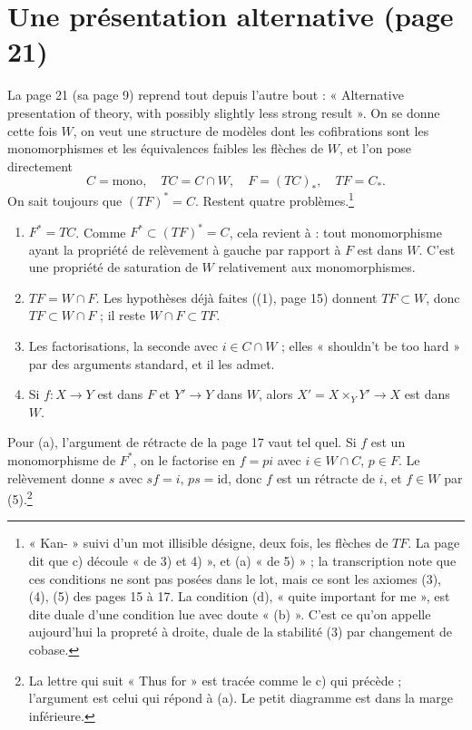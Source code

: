 \documentclass[11pt,a4paper]{article}
\begin{document}
\section*{Une présentation alternative (page 21)}

La page 21 (sa page 9) reprend tout depuis l'autre bout : « Alternative
presentation of theory, with possibly slightly less strong result ». On se
donne cette fois $W$, on veut une structure de modèles dont les cofibrations
sont les monomorphismes et les équivalences faibles les flèches de $W$, et
l'on pose directement
\[
C = \text{mono}, \quad TC = C \cap W, \quad F = (TC)_*, \quad TF = C_* .
\]
On sait toujours que $(TF)^* = C$. Restent quatre problèmes.\footnote{« Kan- » suivi d'un mot illisible désigne, deux fois, les flèches de
$TF$. La page dit que c) découle « de 3) et 4) », et (a) « de 5) » ; la
transcription note que ces conditions ne sont pas posées dans le lot, mais ce
sont les axiomes (3), (4), (5) des pages 15 à 17. La condition (d), « quite
important for me », est dite duale d'une condition lue avec doute « (b) ».
C'est ce qu'on appelle aujourd'hui la propreté à droite, duale de la
stabilité (3) par changement de cobase.}
\begin{enumerate}
\item[(a)] $F^* = TC$. Comme $F^* \subset (TF)^* = C$, cela revient à : tout
monomorphisme ayant la propriété de relèvement à gauche par rapport à $F$ est
dans $W$. C'est une propriété de saturation de $W$ relativement aux
monomorphismes.
\item[(b)] $TF = W \cap F$. Les hypothèses déjà faites ((1), page 15) donnent
$TF \subset W$, donc $TF \subset W \cap F$ ; il reste $W \cap F \subset TF$.
\item[c)] Les factorisations, la seconde avec $i \in C \cap W$ ; elles
« shouldn't be too hard » par des arguments standard, et il
les admet.
\item[(d)] Si $f : X \to Y$ est dans $F$ et $Y' \to Y$ dans $W$, alors
$X' = X \times_Y Y' \to X$ est dans $W$.
\end{enumerate}

Pour (a), l'argument de rétracte de la page 17 vaut tel quel. Si $f$ est un
monomorphisme de $F^*$, on le factorise en $f = pi$ avec $i \in W \cap C$,
$p \in F$. Le relèvement donne $s$ avec $sf = i$, $ps = \mathrm{id}$, donc $f$
est un rétracte de $i$, et $f \in W$ par (5).\footnote{La lettre qui suit « Thus
for » est tracée comme le c) qui précède ; l'argument est celui qui répond à
(a). Le petit diagramme est dans la marge inférieure.}
\end{document}
